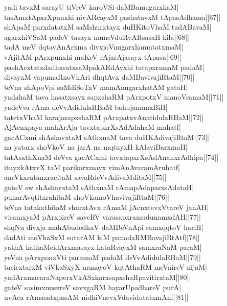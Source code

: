 \documentclass{article}
\begin{document}
yadi tavxM sarayU tiVreV karoVSi daMBamugarxkaM|\\
tasAmxtApxrXpunxhi nivARcayxM pashutavxM tApasAdhama||67||\\
shApaM parxdatatxM saMshurxtayx duHKitoVhaM tadABavaM|\\
agarxhiVSaM padeV tasayx muneVduRvARsasaH kila||68||\\
tadA meV dqtavAnArxma divxjoVnugarxhamutatxmaM|\\
vAjitAM pArxpunxhi maKeV rAjarAjasayx tApasa||69||\\
pashAcxtatxdadhxsatxsaMpakARdAyxhi tatapxramaM padaM|\\
divayxM vapumaRnoVhAri dhqtAvx daMBavivajiRtaM||70||\\
teVna shApoVpi saMdiSoTxV mamAnugarxhatAM gataH|\\
yadahaM tava hasatxsayx sapxshaRM pArxpotxV manoVramaM||71||\\
yadeVva rAma deVvAdidulaRBaM bahujanamxBiH|\\
tatetxVhaM karajasapxshaRM pArxpatxvAnatidulaRBaM||72||\\
AjAcnxpaya mahArAja tavxtapxrXsAdAdahaM mahatf|\\
gacACxmi shAshavxtaM sAthxnaM tava duHKAdivajiRtaM||73||\\
na yatarx shoVkoV na jarA na mqtuyxH kAlaviBarxmaH|\\
tatAsxthXnaM deVva gacACxmi tavxtapxrXsAdAnanxrAdhipa||74||\\
ituyxkAtxvX taM parikarxmayx vimAnAvaramAruhatf|\\
aneVkaratanxracitaM savaRdeVvAdivaMditaM||75||\\
gatoV sw shAshavxtaM sAthxnaM rAmapAdaparxsAdataH|\\
punarAvqtitxrahitaM shoVkamoVhavivajiRtaM||76||\\
teVna tatakxthitaM shurxtAvx rAmaM jAcnxtevxVtareV janAH|\\
visamxyaM pArxpireV saveRV varasapxramudunamxdAH||77||\\
shqNu divxja mahAbudedhxV daMBeVnApi samxqqtoV hariH|\\
dadAti moVkaSxM sutarAM kiM punadaRMBavajiRtAtf||78||\\
yathA kathaMcidArxmasayx kataRvayxM samxraNaM paraM|\\
yeVna pArxponxVti paramaM padaM deVvAdidulaRBaM||79||\\
tacicxtarxM viVkaSxyX munayoV kqtAthaRM meVnireV nijaM|\\
yadArxmacaraNaperxVkASxkarasapxshaRpavitirxtaM||80||\\
gateV sasimxnusxreV savxgaRM hayarUpadhareV purA|\\
uvAca rAmasatxpasAM nidhiVnevxVdavidutatxmAnf||81||\\
\end{document}
